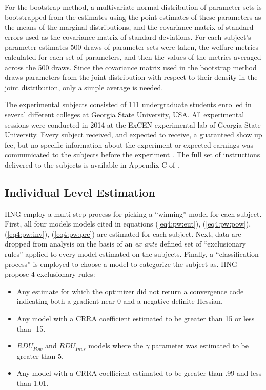 \documentclass[../main.tex]{subfiles}
\begin{document}
For the bootstrap method, a multivariate normal distribution of parameter sets is bootstrapped from the estimates using the point estimates of these parameters as the means of the marginal distributions, and the covariance matrix of standard errors used as the covariance matrix of standard deviations.
For each subject's parameter estimates 500 draws of parameter sets were taken, the welfare metrics calculated for each set of parameters, and then the values of the metrics averaged across the 500 draws.
Since the covariance matrix used in the bootstrap method draws parameters from the joint distribution with respect to their density in the joint distribution, only a simple average is needed.

The experimental subjects consisted of 111 undergraduate students enrolled in several different colleges at Georgia State University, USA.
All experimental sessions were conducted in 2014 at the ExCEN experimental lab of Georgia State University.
Every subject received, and expected to receive, a guaranteed  show up fee, but no specific information about the experiment or expected earnings was communicated to the subjects before the experiment \parencite[98]{Harrison2016}.
The full set of instructions delivered to the subjects is available in Appendix C of \textcite{Harrison2016}.

\subsection{Individual Level Estimation}
\label{sec4:ILE}

HNG employ a multi-step process for picking a \enquote{winning} model for each subject.
First, all four models models cited in equations (\ref{eq4:pw:eut}), (\ref{eq4:pw:pow}), (\ref{eq4:pw:inv}), (\ref{eq4:pw:pre}) are estimated for each subject.
Next, data are dropped from analysis on the basis of an \textit{ex ante} defined set of \enquote{exclusionary rules} applied to every model estimated on the subjects.
Finally, a \enquote{classification process} is employed to choose a model to categorize the subject as.
HNG propose 4 exclusionary rules:
\begin{itemize}
	\item Any estimate for which the optimizer did not return a convergence code indicating both a gradient near 0 and a negative definite Hessian.
	\item Any model with a CRRA coefficient estimated to be greater than 15 or less than -15.
	\item $\mathit{RDU_{Pow}}$ and $\mathit{RDU_{Invs}}$ models where the $\gamma$ parameter was estimated to be greater than 5.
	\item Any model with a CRRA coefficient estimated to be greater than .99 and less than 1.01.
\end{itemize}
\end{document}

